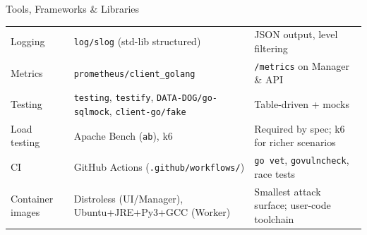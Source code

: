 \documentclass[11pt]{beamer}
\begin{document}
\begin{frame}{Tools, Frameworks \& Libraries}
\begin{table}
\begin{tabular}{lll}
Logging            & \alert{\texttt{log/slog}} (std-lib structured)                   & JSON output, level filtering \\
Metrics            & \texttt{prometheus/client\_golang}                               & \texttt{/metrics} on Manager \& API \\
Testing            & \texttt{testing}, \texttt{testify}, \texttt{DATA-DOG/go-sqlmock}, \texttt{client-go/fake} & Table-driven + mocks \\
Load testing       & \alert{Apache Bench} (\texttt{ab}), k6                           & Required by spec; k6 for richer scenarios \\
CI                 & GitHub Actions (\texttt{.github/workflows/})                     & \texttt{go vet}, \texttt{govulncheck}, race tests \\
Container images   & Distroless (UI/Manager), Ubuntu+JRE+Py3+GCC (Worker)             & Smallest attack surface; user-code toolchain \\
\bottomrule
\end{tabular}
\end{table}
\end{frame}
\end{document}
